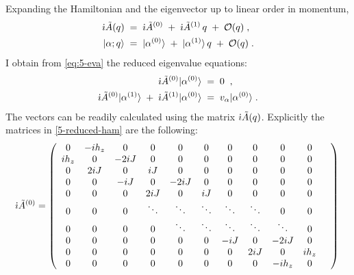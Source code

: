 Expanding the Hamiltonian and the eigenvector up to linear order in momentum,
\begin{align}
    \dot{\imath} \tilde{A}(q) \; &= \;  \dot{\imath} \tilde{A}^{(0)} \; + \; \dot{\imath} \tilde{A}^{(1)} \, q \; + \; \mathcal{O}(q) \; ,\label{5-reduced-ham}\\
    \vert \alpha; q  \rangle  \; &= \;   \vert \alpha^{(0)} \rangle  \; + \;  \vert \alpha^{(1)} \rangle  \, q \; + \; \mathcal{O}(q) \; .
\end{align}
I obtain from \eqref{eq:5-eva} the reduced eigenvalue equations:
\begin{align}
    \dot{\imath} \tilde{A}^{(0)} \vert \alpha^{(0)} \rangle   \; & = \; 0 \;  \; , \label{eq:5-eva-order-zero}\\
    \dot{\imath} \tilde{A}^{(0)} \vert \alpha^{(1)} \rangle  \; + \;
    \dot{\imath} \tilde{A}^{(1)} \vert \alpha^{(0)} \rangle   \; & = \; v_{\alpha} \vert \alpha^{(0)} \rangle   \; . \label{eq:5-eva-order-one}
\end{align}
The vectors can be readily calculated using the matrix $\dot{\imath} \tilde{A}(q)$. Explicitly the matrices in \eqref{5-reduced-ham} are the following:
\begin{equation}
  \im \tilde{A}^{(0)} = 
   \left(
\begin{array}{cccccccccccc}
 0 & -i h_z  & 0 & 0 & 0 & 0 & 0 & 0 & 0 & 0 %
 \\
 i h_z  &0  & -2iJ & 0  & 0 & 0 & 0 & 0 & 0 & 0%
 \\
 0 & 2iJ &0& iJ &0  & 0 & 0 & 0 & 0 & 0%
 \\
 0 & 0  & -iJ& 0  & -2iJ & 0 & 0 & 0 & 0 & 0%
 \\
 0 & 0 & 0  & 2iJ & 0 & iJ &0  & 0 & 0 & 0 %
 \\
 0 & 0 & 0 & \ddots  &  \ddots & \ddots  & \ddots & \ddots  & 0 & 0%
 \\
 0 & 0 & 0 & 0 & \ddots & \ddots & \ddots  & \ddots &  \ddots  & 0 & %
 \\
0 & 0 & 0 & 0 & 0 & 0  & -iJ & 0  & -2 i J & 0 \\
0 & 0 & 0 & 0 & 0 & 0 &0  & 2iJ & 0  & i h_z  \\
0 & 0 & 0 & 0 & 0 & 0 & 0 & 0 & -i h_z  & 0 \\
\end{array}
\right) \, 
\end{equation}
